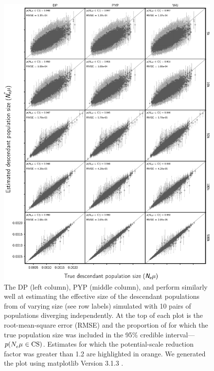 \begin{figure}[htbp]
    \begin{center}
        \includegraphics[width=\textwidth,height=0.9\textheight,keepaspectratio]{../images/from-project-repo/nchars-descendant-size-scatter-cropped.pdf}
        \captionsetup{name=Figure S, labelformat=noSpace, listformat=sFigList}
        \caption{\footnotesize
        The DP (left column),
        PYP (middle column),
        and
        \wunif
        perform similarly well at estimating the effective size of the
        descendant populations from \datasets of varying size (see row labels)
        simulated with 10 pairs of populations diverging independently.
        At the top of each plot is the root-mean-square error (RMSE)
        and
        the proportion of \datasets for which the true population size was
        included in the 95\% credible interval---$p(N_{e}^{}\mu_{} \in
        \textrm{CS})$.
        Estimates for which the potential-scale reduction factor was greater
        than 1.2 \citep{Brooks1998} are highlighted in orange.
        We generated the plot using matplotlib Version 3.1.3
        \citep{matplotlib}.
        }
        \label{fig:descpopsizegridbysize}
    \end{center}
\end{figure}

